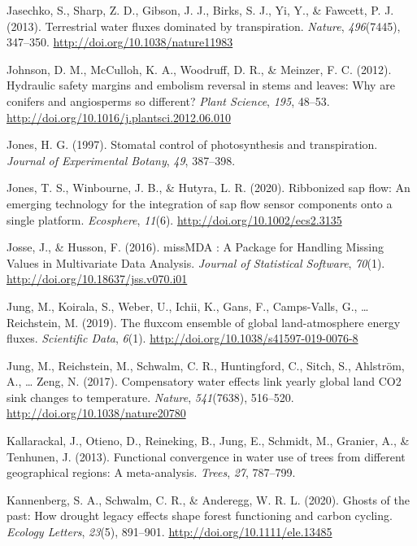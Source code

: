 \documentclass[11pt,twoside]{reedthesis}
\begin{document}
\hypertarget{ref-Jasechko2013}{}
Jasechko, S., Sharp, Z. D., Gibson, J. J., Birks, S. J., Yi, Y., \&
Fawcett, P. J. (2013). Terrestrial water fluxes dominated by
transpiration. \emph{Nature}, \emph{496}(7445), 347--350.
\url{http://doi.org/10.1038/nature11983}

\hypertarget{ref-johnson_hydraulic_2012}{}
Johnson, D. M., McCulloh, K. A., Woodruff, D. R., \& Meinzer, F. C.
(2012). Hydraulic safety margins and embolism reversal in stems and
leaves: Why are conifers and angiosperms so different? \emph{Plant
Science}, \emph{195}, 48--53.
\url{http://doi.org/10.1016/j.plantsci.2012.06.010}

\hypertarget{ref-Jones1997}{}
Jones, H. G. (1997). Stomatal control of photosynthesis and
transpiration. \emph{Journal of Experimental Botany}, \emph{49},
387--398.

\hypertarget{ref-jones_ribbonized_2020}{}
Jones, T. S., Winbourne, J. B., \& Hutyra, L. R. (2020). Ribbonized sap
flow: An emerging technology for the integration of sap flow sensor
components onto a single platform. \emph{Ecosphere}, \emph{11}(6).
\url{http://doi.org/10.1002/ecs2.3135}

\hypertarget{ref-josse_missmda_2016}{}
Josse, J., \& Husson, F. (2016). missMDA : A Package for Handling
Missing Values in Multivariate Data Analysis. \emph{Journal of
Statistical Software}, \emph{70}(1).
\url{http://doi.org/10.18637/jss.v070.i01}

\hypertarget{ref-Jung2019}{}
Jung, M., Koirala, S., Weber, U., Ichii, K., Gans, F., Camps-Valls, G.,
\ldots{} Reichstein, M. (2019). The fluxcom ensemble of global
land-atmosphere energy fluxes. \emph{Scientific Data}, \emph{6}(1).
\url{http://doi.org/10.1038/s41597-019-0076-8}

\hypertarget{ref-jung_compensatory_2017}{}
Jung, M., Reichstein, M., Schwalm, C. R., Huntingford, C., Sitch, S.,
Ahlström, A., \ldots{} Zeng, N. (2017). Compensatory water effects link
yearly global land CO2 sink changes to temperature. \emph{Nature},
\emph{541}(7638), 516--520. \url{http://doi.org/10.1038/nature20780}

\hypertarget{ref-Kallarackal2013}{}
Kallarackal, J., Otieno, D., Reineking, B., Jung, E., Schmidt, M.,
Granier, A., \& Tenhunen, J. (2013). Functional convergence in water use
of trees from different geographical regions: A meta-analysis.
\emph{Trees}, \emph{27}, 787--799.

\hypertarget{ref-kannenberg_ghosts_2020}{}
Kannenberg, S. A., Schwalm, C. R., \& Anderegg, W. R. L. (2020). Ghosts
of the past: How drought legacy effects shape forest functioning and
carbon cycling. \emph{Ecology Letters}, \emph{23}(5), 891--901.
\url{http://doi.org/10.1111/ele.13485}
\end{document}
